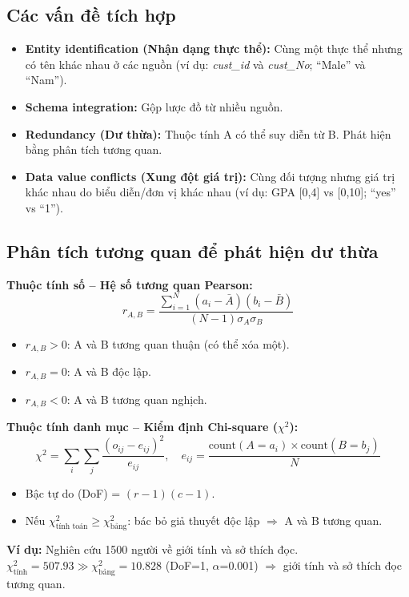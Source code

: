 \documentclass[10pt]{article}
\begin{document}
\subsection{Các vấn đề tích hợp}

\begin{itemize}
    \item \textbf{Entity identification (Nhận dạng thực thể):} Cùng một thực thể nhưng có tên khác nhau ở các nguồn (ví dụ: \textit{cust\_id} và \textit{cust\_No}; ``Male'' và ``Nam'').
    \item \textbf{Schema integration:} Gộp lược đồ từ nhiều nguồn.
    \item \textbf{Redundancy (Dư thừa):} Thuộc tính A có thể suy diễn từ B. Phát hiện bằng phân tích tương quan.
    \item \textbf{Data value conflicts (Xung đột giá trị):} Cùng đối tượng nhưng giá trị khác nhau do biểu diễn/đơn vị khác nhau (ví dụ: GPA [0,4] vs [0,10]; ``yes'' vs ``1'').
\end{itemize}

\subsection{Phân tích tương quan để phát hiện dư thừa}

\textbf{Thuộc tính số -- Hệ số tương quan Pearson:}
\[
r_{A,B} = \frac{\sum_{i=1}^{N}(a_i - \bar{A})(b_i - \bar{B})}{(N-1)\sigma_A \sigma_B}
\]
\begin{itemize}
    \item $r_{A,B} > 0$: A và B tương quan thuận (có thể xóa một).
    \item $r_{A,B} = 0$: A và B độc lập.
    \item $r_{A,B} < 0$: A và B tương quan nghịch.
\end{itemize}

\textbf{Thuộc tính danh mục -- Kiểm định Chi-square ($\chi^2$):}
\[
\chi^2 = \sum_{i}\sum_{j} \frac{(o_{ij} - e_{ij})^2}{e_{ij}}, \quad e_{ij} = \frac{\text{count}(A=a_i) \times \text{count}(B=b_j)}{N}
\]
\begin{itemize}
    \item Bậc tự do (DoF) = $(r-1)(c-1)$.
    \item Nếu $\chi^2_{\text{tính toán}} \geq \chi^2_{\text{bảng}}$: bác bỏ giả thuyết độc lập $\Rightarrow$ A và B tương quan.
\end{itemize}

\textbf{Ví dụ:} Nghiên cứu 1500 người về giới tính và sở thích đọc. $\chi^2_{\text{tính}} = 507.93 \gg \chi^2_{\text{bảng}} = 10.828$ (DoF=1, $\alpha$=0.001) $\Rightarrow$ giới tính và sở thích đọc tương quan.
\end{document}
